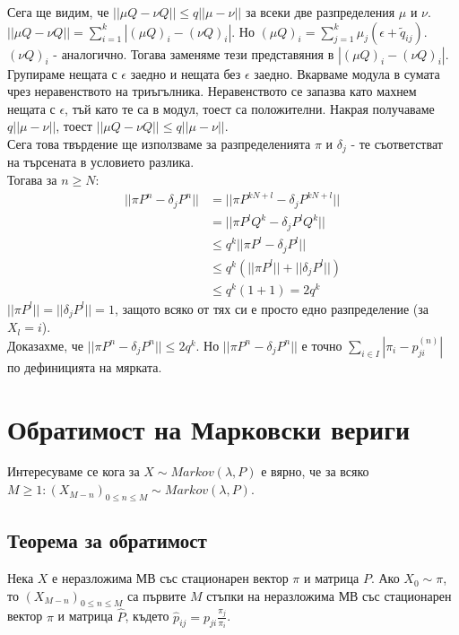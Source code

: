 \documentclass{article}
\begin{document}
Сега ще видим, че $||\mu Q - \nu Q|| \leq q||\mu - \nu||$ за всеки две разпределения $\mu$ и $\nu$. 
$||\mu Q - \nu Q|| = \sum_{i=1}^k |(\mu Q)_i - (\nu Q)_i|$. 
Но $(\mu Q)_i = \sum_{j=1}^k \mu_j (\epsilon + \tilde{q}_{ij})$. $(\nu Q)_i$ - аналогично. Тогава заменяме тези 
представяния в $|(\mu Q)_i - (\nu Q)_i|$. Групираме нещата с $\epsilon$ заедно и нещата без $\epsilon$ заедно. 
Вкарваме модула в сумата чрез неравенството на триъгълника. Неравенството се запазва като махнем нещата с $\epsilon$, 
тъй като те са в модул, тоест са положителни. Накрая получаваме $q||\mu - \nu||$, тоест $||\mu Q - \nu Q|| \leq q||\mu - \nu||$. \\

Сега това твърдение ще използваме за разпределенията $\pi$ и $\delta_j$ - те съответстват на търсената в условието разлика. \\
Тогава за $n \geq N$:
\begin{align*}
||\pi P^n - \delta_j P^n|| &= ||\pi P^{kN + l} - \delta_j P^{kN + l}|| \\
&= ||\pi P^l Q^k - \delta_j P^l Q^k|| \\
&\leq q^k ||\pi P^l - \delta_j P^l|| \\
&\leq q^k (||\pi P^l|| + ||\delta_j P^l||) \\
&\leq q^k (1 + 1) = 2q^k
\end{align*}
$||\pi P^l|| = ||\delta_j P^l|| = 1$, защото всяко от тях си е просто едно разпределение (за $X_l = i$). \\

Доказахме, че $||\pi P^n - \delta_j P^n|| \leq 2q^k$. Но $||\pi P^n - \delta_j P^n||$ е точно $\sum_{i \in I} |\pi_i - p_{ji}^{(n)}|$ по дефиницията на мярката.

\section{Обратимост на Марковски вериги}
Интересуваме се кога за $X \sim Markov(\lambda,P)$ е вярно, че за всяко $M\geq1: (X_{M-n})_{0\leq n \leq M} \sim Markov(\lambda,P)$.
\subsection{Теорема за обратимост}
Нека $X$ е неразложима МВ със стационарен вектор $\pi$ и матрица $P$. Ако $X_0 \sim \pi$, то $(X_{M-n})_{0 \leq n \leq M}$ са първите $M$ стъпки на неразложима МВ със стационарен вектор $\pi$ и матрица $\hat{P}$, където $\hat{p}_{ij} = p_{ji}\frac{\pi_j}{\pi_i}$.
\end{document}
